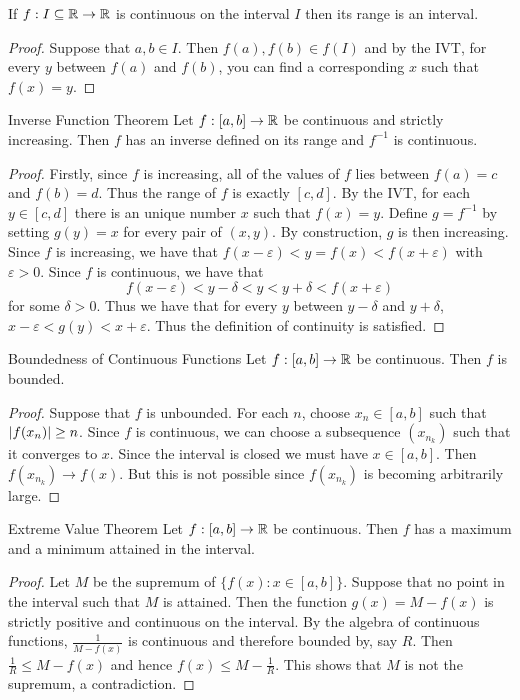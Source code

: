 \documentclass[a4paper]{article}
\begin{document}
\begin{prp}{}{} If $f:I\subseteq\mathbb{R}\to\mathbb{R}$ is continuous on the interval $I$ then its range is an interval. \tcbline
\begin{proof} Suppose that $a,b\in I$. Then $f(a),f(b)\in f(I)$ and by the IVT, for every $y$ between $f(a)$ and $f(b)$, you can find a corresponding $x$ such that $f(x)=y$. 
\end{proof}
\end{prp}

\begin{prp}{Inverse Function Theorem}{} Let $f:[a,b]\to\mathbb{R}$ be continuous and strictly increasing. Then $f$ has an inverse defined on its range and $f^{-1}$ is continuous. \tcbline
\begin{proof} Firstly, since $f$ is increasing, all of the values of $f$ lies between $f(a)=c$ and $f(b)=d$. Thus the range of $f$ is exactly $[c,d]$. By the IVT, for each $y\in[c,d]$ there is an unique number $x$ such that $f(x)=y$. Define $g=f^{-1}$ by setting $g(y)=x$ for every pair of $(x,y)$. By construction, $g$ is then increasing. Since $f$ is increasing, we have that $f(x-\varepsilon)<y=f(x)<f(x+\varepsilon)$ with $\varepsilon>0$. Since $f$ is continuous, we have that $$f(x-\varepsilon)<y-\delta<y<y+\delta<f(x+\varepsilon)$$ for some $\delta>0$. Thus we have that for every $y$ between $y-\delta$ and $y+\delta$, $x-\varepsilon<g(y)<x+\varepsilon$. Thus the definition of continuity is satisfied. 
\end{proof}
\end{prp}

\begin{thm}{Boundedness of Continuous Functions}{} Let $f:[a,b]\to\mathbb{R}$ be continuous. Then $f$ is bounded. \tcbline
\begin{proof} Suppose that $f$ is unbounded. For each $n$, choose $x_n\in[a,b]$ such that $\abs{f(x_n)}\geq n$. Since $f$ is continuous, we can choose a subsequence $(x_{n_k})$ such that it converges to $x$. Since the interval is closed we must have $x\in[a,b]$. Then $f(x_{n_k})\to f(x)$. But this is not possible since $f(x_{n_k})$ is becoming arbitrarily large. 
\end{proof}
\end{thm}

\begin{thm}{Extreme Value Theorem}{} Let $f:[a,b]\to\mathbb{R}$ be continuous. Then $f$ has a maximum and a minimum attained in the interval. \tcbline
\begin{proof} Let $M$ be the supremum of $\{f(x):x\in[a,b]\}$. Suppose that no point in the interval such that $M$ is attained. Then the function $g(x)=M-f(x)$ is strictly positive and continuous on the interval. By the algebra of continuous functions, $\frac{1}{M-f(x)}$ is continuous and therefore bounded by, say $R$. Then $\frac{1}{R}\leq M-f(x)$ and hence $f(x)\leq M-\frac{1}{R}$. This shows that $M$ is not the supremum, a contradiction. 
\end{proof}
\end{thm}
\end{document}
